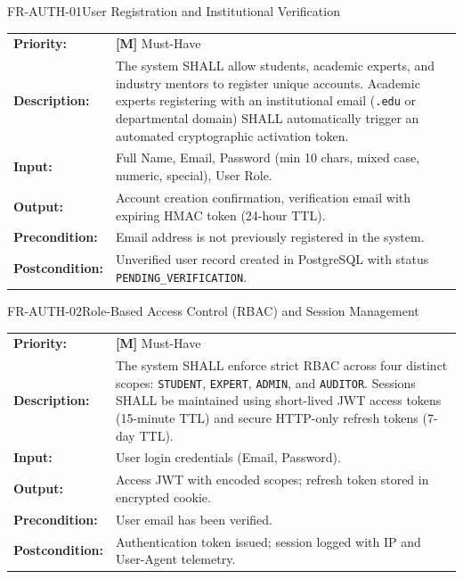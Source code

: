 \documentclass[11pt,a4paper]{article}
\begin{document}
\begin{reqbox}{FR-AUTH-01}{User Registration and Institutional Verification}
\begin{tabularx}{\textwidth}{@{}lX@{}}
\textbf{Priority:} & \textbf{[M]} Must-Have \\
\textbf{Description:} & The system SHALL allow students, academic experts, and industry mentors to register unique accounts. Academic experts registering with an institutional email (\texttt{.edu} or departmental domain) SHALL automatically trigger an automated cryptographic activation token. \\
\textbf{Input:} & Full Name, Email, Password (min 10 chars, mixed case, numeric, special), User Role. \\
\textbf{Output:} & Account creation confirmation, verification email with expiring HMAC token (24-hour TTL). \\
\textbf{Precondition:} & Email address is not previously registered in the system. \\
\textbf{Postcondition:} & Unverified user record created in PostgreSQL with status \texttt{PENDING\_VERIFICATION}. \\
\end{tabularx}
\end{reqbox}

\begin{reqbox}{FR-AUTH-02}{Role-Based Access Control (RBAC) and Session Management}
\begin{tabularx}{\textwidth}{@{}lX@{}}
\textbf{Priority:} & \textbf{[M]} Must-Have \\
\textbf{Description:} & The system SHALL enforce strict RBAC across four distinct scopes: \texttt{STUDENT}, \texttt{EXPERT}, \texttt{ADMIN}, and \texttt{AUDITOR}. Sessions SHALL be maintained using short-lived JWT access tokens (15-minute TTL) and secure HTTP-only refresh tokens (7-day TTL). \\
\textbf{Input:} & User login credentials (Email, Password). \\
\textbf{Output:} & Access JWT with encoded scopes; refresh token stored in encrypted cookie. \\
\textbf{Precondition:} & User email has been verified. \\
\textbf{Postcondition:} & Authentication token issued; session logged with IP and User-Agent telemetry. \\
\end{tabularx}
\end{reqbox}
\end{document}
